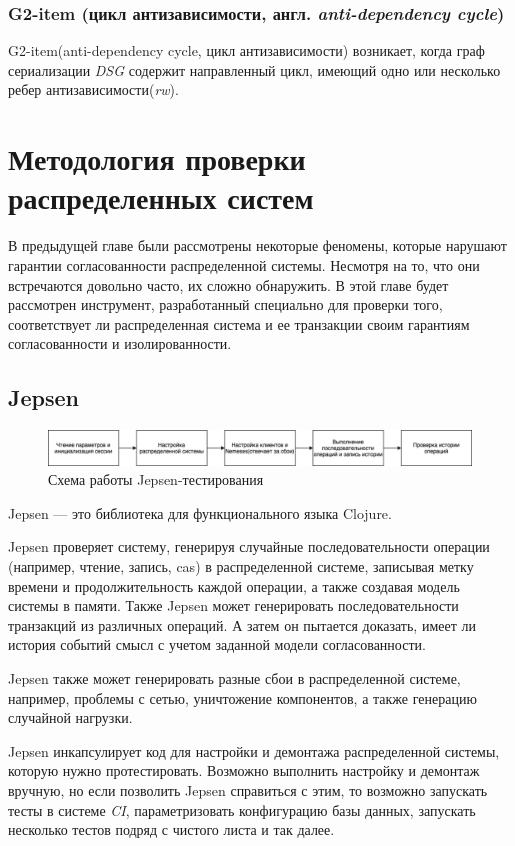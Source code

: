 \documentclass[12pt,  openany]{book}
\begin{document}
\subsection{G2-item (цикл антизависимости, англ. \textit{anti-dependency cycle})}
G2-item(anti-dependency cycle, цикл антизависимости) возникает, когда граф сериализации \textit{DSG} содержит направленный цикл, имеющий одно или несколько ребер антизависимости(\textit{rw}). 

\chapter{Методология проверки распределенных систем}
В предыдущей главе были рассмотрены некоторые феномены, которые нарушают гарантии согласованности распределенной системы. Несмотря на то, что они встречаются довольно часто, их сложно обнаружить.  В этой главе будет рассмотрен инструмент, разработанный специально для проверки того, соответствует ли распределенная система и ее транзакции своим гарантиям согласованности и изолированности.
\section{Jepsen}
\begin{figure}[H]
  \includegraphics[width=\textwidth]{jepsen.jpeg}
  \caption{Схема работы Jepsen-тестирования}
\end{figure}
\par Jepsen --- это библиотека для функционального языка Clojure.
\par Jepsen проверяет систему, генерируя случайные последовательности операции (например, чтение, запись, cas) в распределенной системе, записывая метку времени и продолжительность каждой операции, а также создавая модель системы в памяти.  Также Jepsen может генерировать последовательности транзакций из различных операций. А затем он пытается доказать, имеет ли история событий смысл с учетом заданной модели согласованности.
\par Jepsen также может генерировать разные сбои в распределенной системе, например, проблемы с сетью, уничтожение компонентов, а также генерацию случайной нагрузки.
\par Jepsen инкапсулирует код для настройки и демонтажа распределенной системы, которую нужно протестировать. Возможно выполнить настройку и демонтаж вручную, но если позволить Jepsen справиться с этим, то возможно запускать тесты в системе \textit{CI}, параметризовать конфигурацию базы данных, запускать несколько тестов подряд с чистого листа и так далее.
\end{document}
